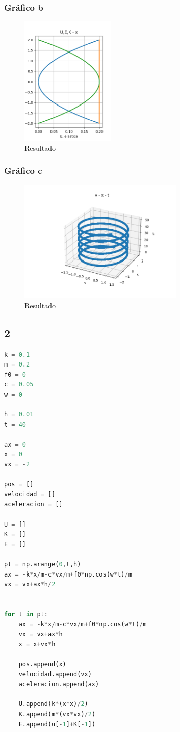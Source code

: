 \documentclass{article}
\begin{document}
\subsubsection{Gráfico b}
\begin{figure}[H]
    \centering
    \includegraphics[width=0.4\textwidth]{Figure_2.png}
    \caption{Resultado}
\end{figure}

\subsubsection{Gráfico c}
\begin{figure}[H]
    \centering
    \includegraphics[width=0.7\textwidth]{Figure_3.png}
    \caption{Resultado}
\end{figure}
\newpage
\subsection{2}
\begin{lstlisting}[language=Python,caption=Desafío 1.1]
k = 0.1
m = 0.2
f0 = 0
c = 0.05
w = 0

h = 0.01
t = 40

ax = 0
x = 0
vx = -2

pos = []
velocidad = []
aceleracion = []

U = []
K = []
E = []

pt = np.arange(0,t,h)
ax = -k*x/m-c*vx/m+f0*np.cos(w*t)/m
vx = vx+ax*h/2


for t in pt:
    ax = -k*x/m-c*vx/m+f0*np.cos(w*t)/m
    vx = vx+ax*h
    x = x+vx*h

    pos.append(x)
    velocidad.append(vx)
    aceleracion.append(ax)

    U.append(k*(x*x)/2)
    K.append(m*(vx*vx)/2)
    E.append(u[-1]+K[-1])

\end{lstlisting}
\end{document}
